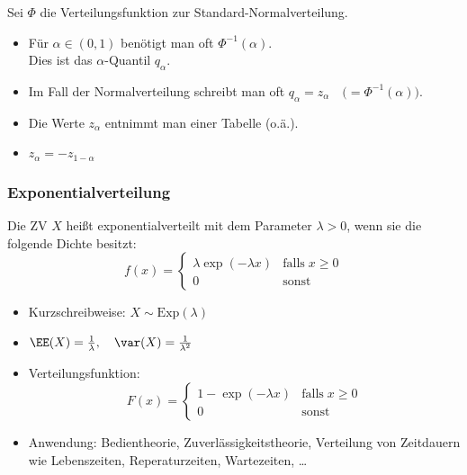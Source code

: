 Sei $\Phi$ die Verteilungsfunktion zur Standard-Normalverteilung.
\begin{itemize}
\item Für $\alpha \in (0,1)$ benötigt man oft $\Phi^{-1}(\alpha)$.\\
Dies ist das $\alpha$-Quantil $q_\alpha$.
\item Im Fall der Normalverteilung schreibt man oft $q_\alpha = z_\alpha \quad\Big(=\Phi^{-1}(\alpha)\Big)$.
\item Die Werte $z_\alpha$ entnimmt man einer Tabelle (o.ä.).
\item $z_\alpha = - z_{1-\alpha}$
\end{itemize}

\subsubsection{Exponentialverteilung}
 Die ZV $X$ heißt exponentialverteilt mit dem Parameter $\lambda >0$, wenn sie die folgende Dichte besitzt:
$$f(x)=\begin{cases}
\lambda \exp(-\lambda x) & \mathrm{falls} \; x\geq 0\\
0 & \mathrm{sonst}
\end{cases}
$$
\begin{itemize}
\item Kurzschreibweise: $X\sim \mathrm{Exp}(\lambda)$
\item $\EE(X)=\frac{1}{\lambda}, \quad \var(X)=\frac{1}{\lambda^2}$
\item Verteilungsfunktion:
$$F(x)=\begin{cases}
1-\exp(-\lambda x) & \mathrm{falls}\; x \geq 0\\
0 & \mathrm{sonst}
\end{cases}$$
\item Anwendung: Bedientheorie, Zuverlässigkeitstheorie, Verteilung von Zeitdauern wie Lebenszeiten, Reperaturzeiten, Wartezeiten, …
\end{itemize}

